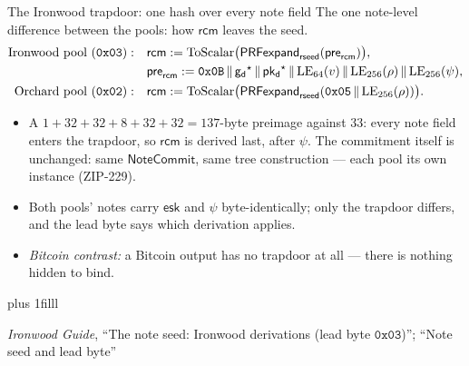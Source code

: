 \documentclass[aspectratio=169,11pt]{beamer}
\newcommand{\gd}{\ensuremath{\mathsf{g_d}}}
\newcommand{\pkd}{\ensuremath{\mathsf{pk_d}}}
\newcommand{\rcm}{\ensuremath{\mathsf{rcm}}}
\newcommand{\esk}{\ensuremath{\mathsf{esk}}}
\newcommand{\NoteCommit}{\ensuremath{\mathsf{NoteCommit}}}
\newcommand{\src}[1]{\par\vskip0pt plus 1filll
  {\fontsize{6}{7.2}\selectfont\color{arbdim}\raggedright #1\par}}
\begin{document}
\begin{frame}{The Ironwood trapdoor: one hash over every note field}
The one note-level difference between the pools: how \rcm{} leaves the
seed.
\begin{align*}
\text{Ironwood pool } (\mathtt{0x03}):&\quad
\rcm := \mathrm{ToScalar}\bigl(\mathsf{PRFexpand}_{\Frseed}(\Fpre)\bigr),\\
&\quad \Fpre := \mathtt{0x0B} \,\|\, \gd^\star \,\|\, \pkd^\star \,\|\,
  \mathrm{LE}_{64}(v) \,\|\, \mathrm{LE}_{256}(\rho) \,\|\,
  \mathrm{LE}_{256}(\psi),\\
\text{Orchard pool } (\mathtt{0x02}):&\quad
\rcm := \mathrm{ToScalar}\bigl(\mathsf{PRFexpand}_{\Frseed}(
  \mathtt{0x05} \,\|\, \mathrm{LE}_{256}(\rho))\bigr).
\end{align*}
\begin{itemize}
  \item A $1 + 32 + 32 + 8 + 32 + 32 = 137$-byte preimage against $33$:
    every note field enters the trapdoor, so \rcm{} is derived last, after
    $\psi$. The commitment itself is unchanged: same \NoteCommit, same
    tree construction --- each pool its own instance (ZIP-229).
  \item Both pools' notes carry \esk{} and $\psi$ byte-identically; only
    the trapdoor differs, and the lead byte says which derivation
    applies.
  \item \emph{Bitcoin contrast:} a Bitcoin output has no trapdoor at all
    --- there is nothing hidden to bind.
\end{itemize}
\src{\emph{Ironwood Guide}, ``The note seed: Ironwood derivations (lead
  byte $\mathtt{0x03}$)''; ``Note seed and lead byte''}
\end{frame}
\end{document}
